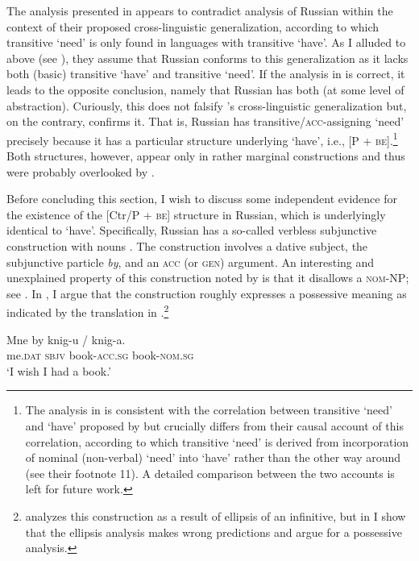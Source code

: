 \documentclass[output=paper,colorlinks,citecolor=brown]{langscibook}
\begin{document}
The analysis presented in  appears to contradict  analysis of Russian within the context of their proposed cross-linguistic generalization, according to which transitive `need' is only found in languages with transitive `have'. As I alluded to above (see ), they assume that Russian conforms to this generalization as it lacks both (basic) transitive `have' and transitive `need'. If the analysis in  is correct, it leads to the opposite conclusion, namely that Russian has both (at some level of abstraction). Curiously, this does not falsify \citeauthor{Harves.Kayne2012}'s cross-linguistic generalization but, on the contrary, confirms it. That is, Russian has transitive/\textsc{acc}-assigning `need' precisely because it has a particular structure underlying `have', i.e., [P + \textsc{be}].\footnote{The analysis in  is consistent with the correlation between transitive `need' and `have' proposed by \citet{Harves.Kayne2012} but crucially differs from their causal account of this correlation, according to which transitive `need' is derived from incorporation of nominal (non-verbal) `need' into `have' rather than the other way around (see their footnote 11). A detailed comparison between the two accounts is left for future work.} Both structures, however, appear only in rather marginal constructions and thus were probably overlooked by \citet{Harves.Kayne2012}.

Before concluding this section, I wish to discuss some independent evidence for the existence of the [Ctr/P + \textsc{be}] structure in Russian, which is underlyingly identical to `have'. Specifically, Russian has a so-called verbless subjunctive construction with nouns \citep[see][]{Dobrushina2015}. The construction involves a dative subject, the subjunctive particle \textit{by}, and an \textsc{acc} (or \textsc{gen}) argument. An interesting and unexplained property of this construction noted by \citet{Dobrushina2015} is that it disallows a \textsc{nom}-NP; see . In \citet{Knyazev2020}, I argue that the construction roughly expresses a possessive meaning as indicated by the translation in .\footnote{\citet{Dobrushina2015} analyzes this construction as a result of ellipsis of an infinitive, but in \citet{Knyazev2020} I show that the ellipsis analysis makes wrong predictions and argue for a possessive analysis.}

\ea \label{by}
\gll Mne by knig-u / \minsp{*} knig-a.\\
me.\textsc{dat} \textsc{sbjv} book-\textsc{acc.sg} {} {} book-\textsc{nom.sg}\\
\glt `I wish I had a book.'
\z
\end{document}
